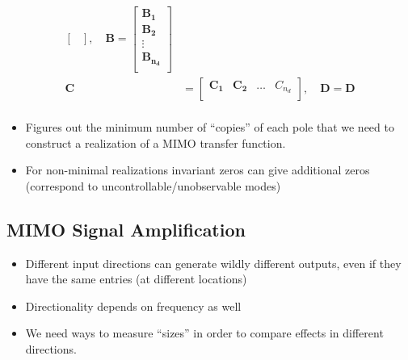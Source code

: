 \begin{enumerate}
\begin{align*}
\begin{bmatrix}
                            \end{bmatrix},\quad
              \mathbf{B} =\begin{bmatrix}
                              \mathbf{B_1}     \\
                              \mathbf{B_2}     \\
                              \vdots           \\
                              \mathbf{B_{n_d}} \\
                          \end{bmatrix}                                                                                                    \\
              \mathbf{C} & =\begin{bmatrix}
                                \mathbf{C_1} & \mathbf{C_2} & \dots & C_{n_d} \\
                            \end{bmatrix}, \quad
              \mathbf{D} = \mathbf{D}                                                                                                                                \\
          \end{align*}
\end{enumerate}


\begin{itemize}
    \item Figures out the minimum number of ``copies'' of each pole that we need to construct a realization of a MIMO transfer function.
    \item For non-minimal realizations invariant zeros can give additional zeros (correspond to uncontrollable/unobservable modes)
\end{itemize}

\subsection{MIMO Signal Amplification}


\begin{itemize}
    \item Different input directions can generate wildly different outputs, even if they have the same entries (at different locations)
    \item Directionality depends on frequency as well
    \item We need ways to measure ``sizes'' in order to compare effects in different directions.
\end{itemize}

